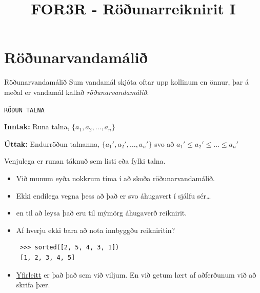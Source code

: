 \documentclass[handout]{beamer}
\title{FOR3R - Röðunarreiknirit I}
\begin{document}
\begin{frame}
\titlepage
\end{frame}

\section{Röðunarvandamálið}

\begin{frame}{Röðunarvandamálið}
Sum vandamál skjóta oftar upp kollinum en önnur, þar á meðal er vandamál kallað \emph{röðunarvandamálið}:

\begin{framed}
\texttt{RÖÐUN TALNA}

\textbf{Inntak:} Runa talna, $\{a_1, a_2, \ldots, a_n\}$

\textbf{Úttak:} Endurröðun talnanna, $\{a_1', a_2', \ldots, a_n'\}$ svo að $a_1' \leq a_2' \leq \ldots \leq a_n'$
\end{framed}

% 
% 

Venjulega er runan táknuð sem listi eða fylki talna.
\end{frame}

\begin{frame}[fragile]
\begin{itemize}
 \item Við munum eyða nokkrum tíma í að skoða röðunarvandamálið.
 \item Ekki endilega vegna þess að það er svo áhugavert í sjálfu sér\ldots
 \pause
 \item en til að leysa það eru til mýmörg áhugaverð reiknirit.
 \pause
 \item Af hverju ekki bara að nota innbyggðu reikniritin?
 \begin{verbatim}
 >>> sorted([2, 5, 4, 3, 1])
 [1, 2, 3, 4, 5]
 \end{verbatim}
 \pause
 \item \href{http://envisage-project.eu/proving-android-java-and-python-sorting-algorithm-is-broken-and-how-to-fix-it/}{Yfirleitt} er það það sem við viljum. En við getum lært af aðferðunum við að skrifa þær.
\end{itemize}
\end{frame}
\end{document}
